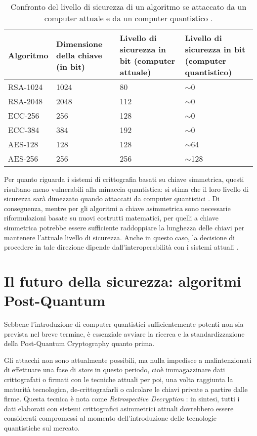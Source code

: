\begin{table}[H]
\centering
\begin{tabular}{ | m{5em} | m{7em}| m{10em} | m{10em} | }
\hline
\textbf{Algoritmo} & \textbf{Dimensione della chiave (in bit)} & \textbf{Livello di sicurezza in bit (computer attuale)} & \textbf{Livello di sicurezza in bit (computer quantistico)} \\ \hline
RSA-1024 & 1024 & 80 & $\sim$0 \\ \hline
RSA-2048 & 2048 & 112 & $\sim$0 \\ \hline
ECC-256 & 256 & 128 & $\sim$0 \\ \hline
ECC-384 & 384 & 192 & $\sim$0 \\ \hline
AES-128 & 128 & 128 & $\sim$64 \\ \hline
AES-256 & 256 & 256 & $\sim$128 \\ \hline
\end{tabular}
\caption{Confronto del livello di sicurezza di un algoritmo se attaccato da un computer attuale e da un computer quantistico \cite{security-levels-symm-asymm-algorithms}.}
\label{tab:SecurityLevelsIntroLegacyQuantum}
\end{table}

Per quanto riguarda i sistemi di crittografia basati su chiave simmetrica, questi risultano meno vulnerabili alla minaccia quantistica: si stima che il loro livello di sicurezza sarà dimezzato quando attaccati da computer quantistici \cite{nature-pqc}. Di conseguenza, mentre per gli algoritmi a chiave asimmetrica sono necessarie riformulazioni basate su nuovi costrutti matematici, per quelli a chiave simmetrica potrebbe essere sufficiente raddoppiare la lunghezza delle chiavi per mantenere l'attuale livello di sicurezza. Anche in questo caso, la decisione di procedere in tale direzione dipende dall'interoperabilità con i sistemi attuali \cite{security-levels-symm-asymm-algorithms}.


\section{Il futuro della sicurezza: algoritmi Post-Quantum}

Sebbene l'introduzione di computer quantistici sufficientemente potenti non sia prevista nel breve termine, è essenziale avviare la ricerca e la standardizzazione della Post-Quantum Cryptography quanto prima. 

Gli attacchi non sono attualmente possibili, ma nulla impedisce a malintenzionati di effettuare una fase di \textit{store} in questo periodo, cioè immagazzinare dati crittografati o firmati con le tecniche attuali per poi, una volta raggiunta la maturità tecnologica, de-crittografarli o calcolare le chiavi private a partire dalle firme. Questa tecnica è nota come \textit{Retrospective Decryption} \cite{enisa-pqc}: in sintesi, tutti i dati elaborati con sistemi crittografici asimmetrici attuali dovrebbero essere considerati compromessi al momento dell'introduzione delle tecnologie quantistiche sul mercato.


